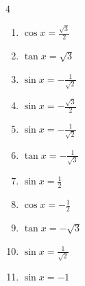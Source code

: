 \begin{multicols}{4}
\begin{enumerate}
  \item $\displaystyle \cos{x}  = \frac{\sqrt{3}}{2}$


  \item $\displaystyle \tan{x}  = \sqrt{3}$


\columnbreak %

\resetques

  \item $\displaystyle \sin{x}  = -\frac{1}{\sqrt{2}}$


  \item $\displaystyle \sin{x}  = -\frac{\sqrt{3}}{2}$


  \item $\displaystyle \sin{x}  = -\frac{1}{\sqrt{2}}$


  \item $\displaystyle \tan{x}  = -\frac{1}{\sqrt{3}}$


  \item $\displaystyle \sin{x}  = \frac{1}{2}$


  \item $\displaystyle \cos{x}  = -\frac{1}{2}$


  \item $\displaystyle \tan{x}  = -\sqrt{3}$


  \item $\displaystyle \sin{x}  = \frac{1}{\sqrt{2}}$


  \item $\displaystyle \sin{x}  = -1$



\end{enumerate}
\end{multicols}
